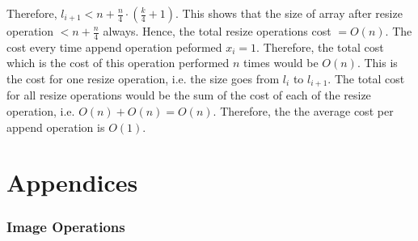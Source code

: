 \documentclass[addpoints]{exam}
\begin{document}
\begin{questions}
\begin{solution}
    \newline
    \newline
    Therefore, $l_{i+1} < n + \frac{n}{4} \cdot \left(\frac{k}{4} + 1\right)$.
    \newline
    \newline
    This shows that the size of array after resize operation $ < n + \frac{n}{4}$ always. Hence, the total resize operations cost $ = O(n)$.
    \newline
    \newline
    The cost every time append operation peformed $x_i =  1$. Therefore, the total cost which is the cost of this operation performed $n$ times would be $O(n)$. This is the cost for one resize operation, i.e. the size goes from $l_i$ to $l_{i+1}$.
    \newline
    \newline
    The total cost for all resize operations would be the sum of the cost of each of the resize operation, i.e. $O(n) + O(n) = O(n)$. Therefore, the the average cost per append operation is $O(1)$.
    


  \end{solution}

\end{questions}

\newpage
\part{Appendices}

\appendix
\section{}


\newpage
\section{}


\newpage
\section{Image Operations}

\end{document}

